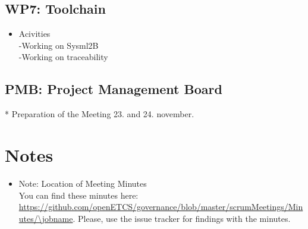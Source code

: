 \documentclass[a4paper, 11pt]{article}
\begin{document}
\subsection{WP7: Toolchain}

\begin{itemize}
\item Acivities\\
 -Working on Sysml2B\\ 
 -Working on traceability\\ 
\end{itemize}

\subsection{PMB: Project Management Board}

* Preparation of the Meeting
23. and 24. november.\\ 
\section{Notes}


\begin{itemize}

\item Note: Location of Meeting Minutes\\
You can find these minutes here: \url{https://github.com/openETCS/governance/blob/master/scrumMeetings/Minutes/\jobname}. Please, use the issue tracker for findings with the minutes.

\end{itemize}
\end{document}
